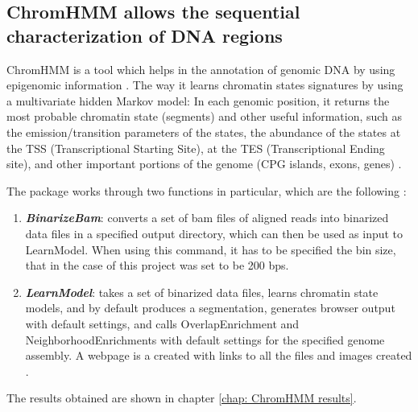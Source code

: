 \subsection{ChromHMM allows the sequential characterization of DNA regions}
ChromHMM is a tool which helps in the annotation of genomic DNA by using epigenomic information
\cite{ernstChromatinstateDiscoveryGenome2017}
. The way it learns chromatin states signatures by using a multivariate hidden Markov model: In each genomic position, it returns the most probable chromatin state (segments) and other useful information, such as the emission/transition parameters of the states, the abundance of the states at the TSS (Transcriptional Starting Site), at the TES (Transcriptional Ending site), and other important portions of the genome (CPG islands, exons, genes)
\cite{chilledhousevibesLearningChromatinStates2015,ernstChromatinstateDiscoveryGenome2017}. 

The package works through two functions in particular, which are the following
\cite{ernstChromatinstateDiscoveryGenome2017}
:
\begin{enumerate}
    \item \textbf{\textit{BinarizeBam}}: converts a set of bam files of aligned reads into binarized data files in a specified output directory, which can then be used as input to LearnModel. When using this command, it has to be specified the bin size, that in the case of this project was set to be 200 bps.
    \item  \textbf{\textit{LearnModel}}: takes a set of binarized data files, learns chromatin state models, and by default produces a segmentation, generates browser output with default settings, and calls OverlapEnrichment and NeighborhoodEnrichments with default settings for the specified genome assembly. A webpage is a created with links to all the files and images created
    . 
\end{enumerate}

The results obtained are shown in chapter \ref{chap: ChromHMM results}.

